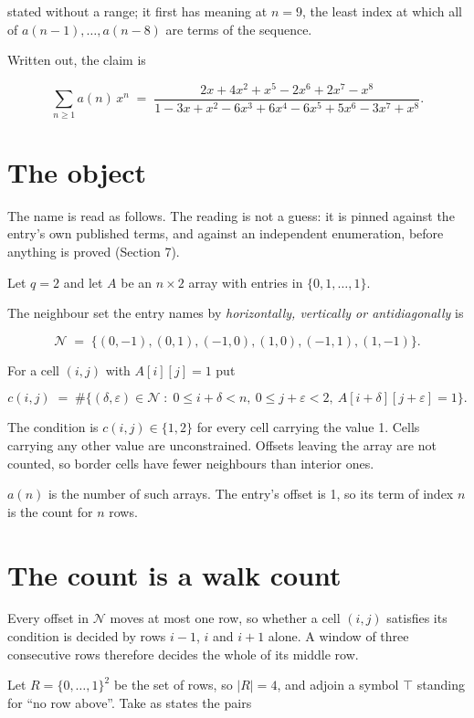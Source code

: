 \documentclass[11pt]{article}
\theoremstyle{definition}
\begin{document}
stated without a range; it first has meaning at $n = 9$, the least index at which all of $a(n-1),\dots,a(n-8)$ are terms of the sequence.

Written out, the claim is

\[\sum_{n \ge 1} a(n)\,x^n \;=\; \frac{2x + 4x^{2} + x^{5} - 2x^{6} + 2x^{7} - x^{8}}{1 - 3x + x^{2} - 6x^{3} + 6x^{4} - 6x^{5} + 5x^{6} - 3x^{7} + x^{8}}.\]

\section{The object}

The name is read as follows. The reading is not a guess: it is pinned against the entry's own published terms, and against an independent enumeration, before anything is proved (Section 7).

Let $q = 2$ and let $A$ be an $n \times 2$ array with entries in $\{0,1,\dots,1\}$.

The neighbour set the entry names by {\itshape horizontally, vertically or antidiagonally} is

\[\mathcal{N} \;=\; \{(0,-1), (0,1), (-1,0), (1,0), (-1,1), (1,-1)\}.\]

For a cell $(i,j)$ with $A[i][j] = 1$ put

\[c(i,j) \;=\; \#\bigl\{(\delta,\varepsilon)\in\mathcal{N} \;:\; 0\le i+\delta<n,\ 0\le j+\varepsilon<2,\ A[i+\delta][j+\varepsilon] = 1\bigr\}.\]

The condition is $c(i,j) \in \{1, 2\}$ for every cell carrying the value 1. Cells carrying any other value are unconstrained. Offsets leaving the array are not counted, so border cells have fewer neighbours than interior ones.

$a(n)$ is the number of such arrays. The entry's offset is 1, so its term of index $n$ is the count for $n$ rows.

\section{The count is a walk count}

Every offset in $\mathcal{N}$ moves at most one row, so whether a cell $(i,j)$ satisfies its condition is decided by rows $i-1$, $i$ and $i+1$ alone. A window of three consecutive rows therefore decides the whole of its middle row.

Let $R = \{0,\dots,1\}^{2}$ be the set of rows, so $|R| = 4$, and adjoin a symbol $\top$ standing for ``no row above''. Take as states the pairs
\end{document}
